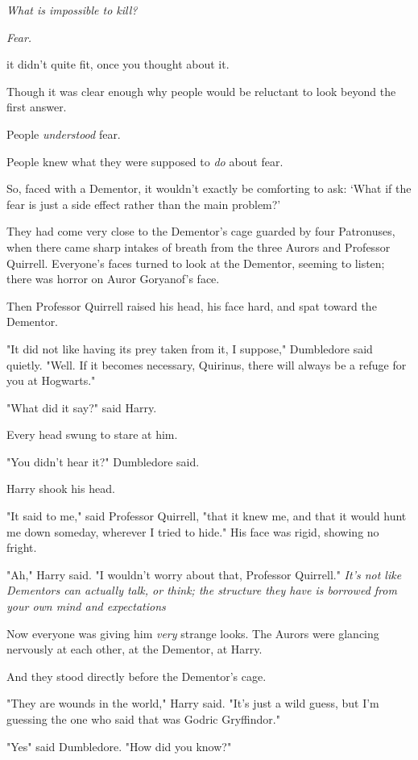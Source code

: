 \emph{What is impossible to kill?}

\emph{Fear.}

{\el} it didn't quite fit, once you thought about it.

Though it was clear enough why people would be reluctant to look beyond the
first answer.

People \emph{understood} fear.

People knew what they were supposed to \emph{do} about fear.

So, faced with a Dementor, it wouldn't exactly be comforting to ask: `What if
the fear is just a side effect rather than the main problem?'

They had come very close to the Dementor's cage guarded by four Patronuses,
when there came sharp intakes of breath from the three Aurors and Professor
Quirrell. Everyone's faces turned to look at the Dementor, seeming to listen;
there was horror on Auror Goryanof's face.

Then Professor Quirrell raised his head, his face hard, and spat toward the
Dementor.

"It did not like having its prey taken from it, I suppose," Dumbledore said
quietly. "Well. If it becomes necessary, Quirinus, there will always be a
refuge for you at Hogwarts."

"What did it say?" said Harry.

Every head swung to stare at him.

"You didn't hear it{\el}?" Dumbledore said.

Harry shook his head.

"It said to me," said Professor Quirrell, "that it knew me, and that it would
hunt me down someday, wherever I tried to hide." His face was rigid, showing no
fright.

"Ah," Harry said. "I wouldn't worry about that, Professor Quirrell." \emph{It's
not like Dementors can actually talk, or think; the structure they have is
borrowed from your own mind and expectations{\el}}

Now everyone was giving him \emph{very} strange looks. The Aurors were glancing
nervously at each other, at the Dementor, at Harry.

And they stood directly before the Dementor's cage.

"They are wounds in the world," Harry said. "It's just a wild guess, but I'm
guessing the one who said that was Godric Gryffindor."

"Yes{\el}" said Dumbledore. "How did you know?"

